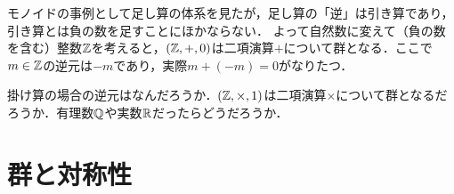 \documentclass[11pt,a4paper]{jsarticle}
\begin{document}
\begin{example}
    モノイドの事例として足し算の体系を見たが，足し算の「逆」は引き算であり，引き算とは負の数を足すことにほかならない．
    よって自然数に変えて（負の数を含む）整数$\mathbb{Z}$を考えると，$(\mathbb{Z}, +, 0)$は二項演算$+$について群となる．ここで$m \in \mathbb{Z}$の逆元は$-m$であり，実際$m + (-m) = 0$がなりたつ．
\end{example}

\begin{exercise}
    掛け算の場合の逆元はなんだろうか．$(\mathbb{Z}, \times, 1)$は二項演算$\times$について群となるだろうか．有理数$\mathbb{Q}$や実数$\mathbb{R}$だったらどうだろうか．
\end{exercise}
 

\section{群と対称性}
\end{document}
